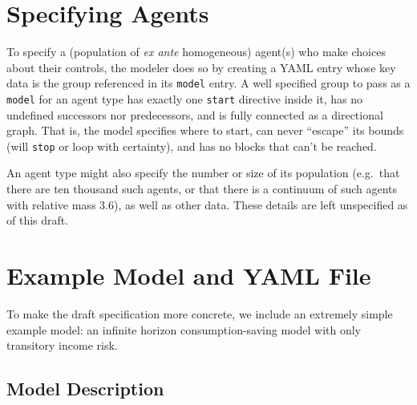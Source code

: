 \documentclass[12pt,pdftex,letterpaper]{article}
\begin{document}


\section{Specifying Agents}

To specify a (population of \textit{ex ante} homogeneous) agent(s) who make choices about their controls, the modeler does so by creating a YAML entry whose key data is the group referenced in its \texttt{model} entry. A well specified group to pass as a \texttt{model} for an agent type has exactly one \texttt{start} directive inside it, has no undefined successors nor predecessors, and is fully connected as a directional graph. That is, the model specifies where to start, can never ``escape'' its bounds (will \texttt{stop} or loop with certainty), and has no blocks that can't be reached.

An agent type might also specify the number or size of its population (e.g.\ that there are ten thousand such agents, or that there is a continuum of such agents with relative mass 3.6), as well as other data. These details are left unspecified as of this draft.


\section{Example Model and YAML File}

To make the draft specification more concrete, we include an extremely simple example model: an infinite horizon consumption-saving model with only transitory income risk.

\subsection{Model Description}
\end{document}

